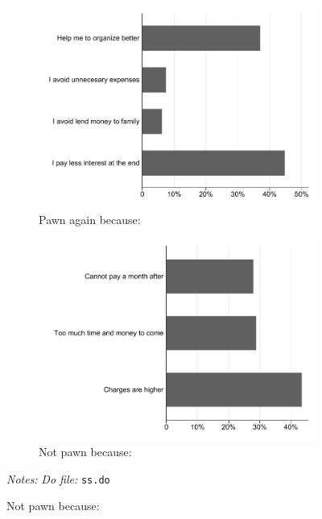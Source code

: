 \documentclass[11pt]{article}
\begin{document}
\begin{figure}[H]
    \caption{Reasons to pawn or not again with monthly payments}
    \label{reasons}
    \begin{center}
    \begin{subfigure}{0.5\textwidth}
        \caption{Pawn again because:}
        \centering
        \includegraphics[width=\textwidth]{Figuras/razones_si.pdf}
    \end{subfigure}
    \begin{subfigure}{0.5\textwidth}
        \caption{Not pawn because:}
        \centering
        \includegraphics[width=\textwidth]{Figuras/razones_no.pdf}
    \end{subfigure}
    \end{center}
     \footnotesize \textit{Notes: } 
      \footnotesize{ \textit{Do file: }  \texttt{ss.do}}
\end{figure}
\end{document}
